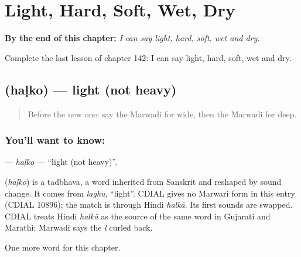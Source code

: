 
\chapter{Light, Hard, Soft, Wet, Dry}
\label{ch:mw-light-hard-soft-wet-dry}

\begin{chapteropening}
\textbf{By the end of this chapter:} \emph{I can say light, hard, soft, wet and dry.}

Complete the last lesson of chapter 142: I can say light, hard, soft, wet and dry.
\end{chapteropening}

\section[\texorpdfstring{\mw{हळको} (haḷko)}{हळको (haḷko)}]{ (haḷko) — light (not heavy)}

\label{lesson:MW-C142-halko}



\begin{quote}
Before the new one: say the Marwadi for wide, then the Marwadi for deep.
\end{quote}

\subsection*{You'll want to know: }
\textbf{} — \emph{haḷko} — \textquotedblleft{}light (not heavy)\textquotedblright{}.

\begin{cousinweb}
\textbf{} (\emph{haḷko}) is a tadbhava, a word inherited from Sanskrit and reshaped by sound change. It comes from \emph{laghu}, \textquotedblleft{}light\textquotedblright{}. CDIAL gives no Marwari form in this entry (CDIAL 10896); the match is through Hindi \emph{halkā}. Its first sounds are swapped. CDIAL treats Hindi \emph{halkā} as the source of the same word in Gujarati and Marathi; Marwadi says the \emph{l} curled back.
\end{cousinweb}

\begin{grammarlens}[title={What you've built}]
One more word for this chapter.
\end{grammarlens}

